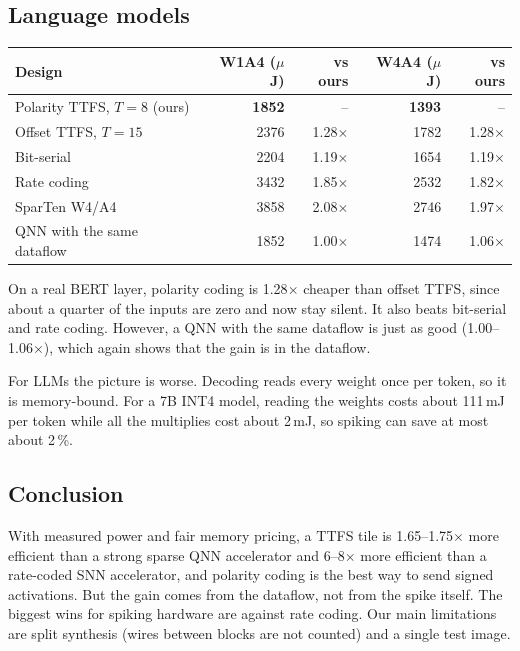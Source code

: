 \documentclass[10pt,a4paper]{article}
\begin{document}
\subsection{Language models}
\begin{content}
\begin{center}\small
{}\label{tab:bert}
\begin{tabular}{lrrrr}
\toprule
Design & W1A4 ($\mu$J) & vs ours & W4A4 ($\mu$J) & vs ours \\
\midrule
Polarity TTFS, $T{=}8$ (ours) & \textbf{1852} & -- & \textbf{1393} & -- \\
Offset TTFS, $T{=}15$ & 2376 & 1.28$\times$ & 1782 & 1.28$\times$ \\
Bit-serial & 2204 & 1.19$\times$ & 1654 & 1.19$\times$ \\
Rate coding & 3432 & 1.85$\times$ & 2532 & 1.82$\times$ \\
SparTen W4/A4 & 3858 & 2.08$\times$ & 2746 & 1.97$\times$ \\
QNN with the same dataflow & 1852 & 1.00$\times$ & 1474 & 1.06$\times$ \\
\bottomrule
\end{tabular}
\end{center}
On a real BERT layer, polarity coding is 1.28$\times$ cheaper than offset TTFS, since about a quarter of the
inputs are zero and now stay silent. It also beats bit-serial and rate coding. However, a QNN with the same
dataflow is just as good (1.00--1.06$\times$), which again shows that the gain is in the dataflow.

For LLMs the picture is worse. Decoding reads every weight once per token, so it is memory-bound. For a 7B INT4
model, reading the weights costs about 111\,mJ per token while all the multiplies cost about 2\,mJ, so spiking
can save at most about 2\,\%.
\end{content}

\subsection{Conclusion}
\begin{content}
With measured power and fair memory pricing, a TTFS tile is 1.65--1.75$\times$ more efficient than a strong
sparse QNN accelerator and 6--8$\times$ more efficient than a rate-coded SNN accelerator, and polarity coding is
the best way to send signed activations. But the gain comes from the dataflow, not from the spike itself. The
biggest wins for spiking hardware are against rate coding. Our main limitations are split synthesis (wires
between blocks are not counted) and a single test image.
\end{content}
\end{document}
